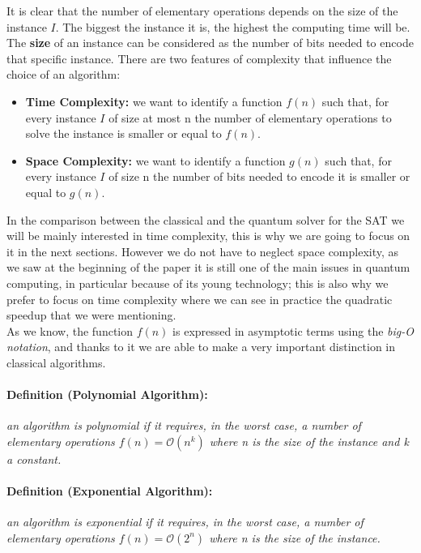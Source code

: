 \documentclass[english]{article}
\begin{document}
			It is clear that the number of elementary operations depends on the size of the instance $I$. The biggest the instance it is, the highest the computing time will be. The \textbf{size} of an instance can be considered as the number of bits needed to encode that specific instance. There are two features of complexity that influence the choice of an algorithm:
			
			\begin{itemize}
				\item \textbf{Time Complexity:} we want to identify a function $f(n)$ such that, for every instance $I$ of size at most n the number of elementary operations to solve the instance is smaller or equal to $f(n)$.
				
				\item \textbf{Space Complexity:} we want to identify a function $g(n)$ such that, for every instance $I$ of size n the number of bits needed to encode it is smaller or equal to $g(n)$.
			\end{itemize}
			
			In the comparison between the classical and the quantum solver for the SAT we will be mainly interested in time complexity, this is why we are going to focus on it in the next sections. However we do not have to neglect space complexity, as we saw at the beginning of the paper it is still one of the main issues in quantum computing, in particular because of its young technology; this is also why we prefer to focus on time complexity where we can see in practice the quadratic speedup that we were mentioning. \\
			
			As we know, the function $f(n)$ is expressed in asymptotic terms using the \emph{big-O notation}, and thanks to it we are able to make a very important distinction in classical algorithms.
			
			\paragraph{Definition (Polynomial Algorithm):} \emph{an algorithm is polynomial if it requires, in the worst case, a number of elementary operations $f(n)=\mathcal{O}(n^k)$ where n is the size of the instance and k a constant.}
			
			\paragraph{Definition (Exponential Algorithm):} \emph{an algorithm is exponential if it requires, in the worst case, a number of elementary operations $f(n)=\mathcal{O}(2^n)$ where n is the size of the instance.} \\
			
\end{document}
